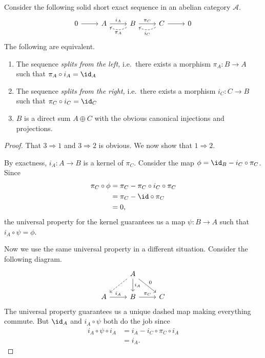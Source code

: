 \documentclass[main.tex]{subfiles}
\begin{document}
\begin{lemma}
  \label{lemma:splitting_lemma}
  Consider the following solid short exact sequence in an abelian category $\mathcal{A}$.
  \begin{equation*}
    \begin{tikzcd}
      0
      \arrow[r]
      & A
      \arrow[r, "i_{A}"]
      & B
      \arrow[r, "\pi_{C}"]
      \arrow[l, bend left, dashed, "\pi_{A}"]
      & C
      \arrow[r]
      \arrow[l, bend left, dashed, "i_{C}"]
      & 0
    \end{tikzcd}
  \end{equation*}
  The following are equivalent.
  \begin{enumerate}
    \item The sequence \emph{splits from the left,} i.e.\ there exists a morphism $\pi_{A}\colon B \to A$ such that $\pi_{A} \circ i_{A} = \id_{A}$

    \item The sequence \emph{splits from the right,} i.e.\ there exists a morphism $i_{C}\colon C \to B$ such that $\pi_{C} \circ i_{C} = \id_{C}$

    \item $B$ is a direct sum $A \oplus C$ with the obvious canonical injections and projections.
  \end{enumerate}
\end{lemma}
\begin{proof}
  That $3 \Rightarrow 1$ and $3 \Rightarrow 2$ is obvious. We now show that $1 \Rightarrow 2$.

  By exactness, $i_{A}\colon A \to B$ is a kernel of $\pi_{C}$. Consider the map $\phi = \id_{B} - i_{C} \circ \pi_{C}$. Since
  \begin{align*}
    \pi_{C} \circ \phi &= \pi_{C} - \pi_{C} \circ i_{C} \circ \pi_{C} \\
    &= \pi_{C} - \id \circ \pi_{C} \\
    &= 0,
  \end{align*}
  the universal property for the kernel guarantees us a map $\psi\colon B \to A$ such that $i_{A} \circ \psi = \phi$.

  Now we use the same universal property in a different situation. Consider the following diagram.
  \begin{equation*}
    \begin{tikzcd}
      & A
      \arrow[d, "i_{A}"]
      \arrow[dl, dashed]
      \arrow[dr, "0"]
      \\
      A
      \arrow[r, "i_{A}"]
      & B
      \arrow[r, "\pi_{C}"]
      & C
    \end{tikzcd}
  \end{equation*}
  The universal property guarantees us a unique dashed map making everything commute. But $\id_{A}$ and $i_{A} \circ \psi$ both do the job since
  \begin{align*}
    i_{A} \circ \psi \circ i_{A} &= i_{A} - i_{C} \circ \pi_{C} \circ i_{A} \\
    &= i_{A}.
  \end{align*}
\end{proof}
\end{document}
